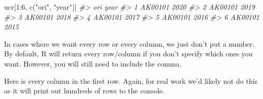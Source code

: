 \documentclass[
]{krantz}
\makeatletter
\newenvironment{Shaded}{\begin{snugshade}}{\end{snugshade}}
\newcommand{\CommentTok}[1]{\textcolor[rgb]{0.37,0.37,0.37}{\textit{#1}}}
\newcommand{\DecValTok}[1]{\textcolor[rgb]{0.06,0.06,0.06}{#1}}
\newcommand{\FunctionTok}[1]{\textcolor[rgb]{0,0,0}{#1}}
\newcommand{\NormalTok}[1]{#1}
\newcommand{\SpecialCharTok}[1]{\textcolor[rgb]{0,0,0}{#1}}
\newcommand{\StringTok}[1]{\textcolor[rgb]{0.5,0.5,0.5}{#1}}
\newenvironment{kframe}{%
\medskip{}
\setlength{\fboxsep}{.8em}
 \def\at@end@of@kframe{}%
 \ifinner\ifhmode%
  \def\at@end@of@kframe{\end{minipage}}%
  \begin{minipage}{\columnwidth}%
 \fi\fi%
 \def\FrameCommand##1{\hskip\@totalleftmargin \hskip-\fboxsep
 \colorbox{shadecolor}{##1}\hskip-\fboxsep
     \hskip-\linewidth \hskip-\@totalleftmargin \hskip\columnwidth}%
 \MakeFramed {\advance\hsize-\width
   \@totalleftmargin\z@ \linewidth\hsize
   \@setminipage}}%
 {\par\unskip\endMakeFramed%
 \at@end@of@kframe}
\renewenvironment{Shaded}{\begin{kframe}}{\end{kframe}}
\makeatother
\begin{document}
\begin{Shaded}
\begin{Highlighting}[]
\NormalTok{ucr[}\DecValTok{1}\SpecialCharTok{:}\DecValTok{6}\NormalTok{, }\FunctionTok{c}\NormalTok{(}\StringTok{"ori"}\NormalTok{, }\StringTok{"year"}\NormalTok{)]}
\CommentTok{\#\textgreater{}       ori year}
\CommentTok{\#\textgreater{} 1 AK00101 2020}
\CommentTok{\#\textgreater{} 2 AK00101 2019}
\CommentTok{\#\textgreater{} 3 AK00101 2018}
\CommentTok{\#\textgreater{} 4 AK00101 2017}
\CommentTok{\#\textgreater{} 5 AK00101 2016}
\CommentTok{\#\textgreater{} 6 AK00101 2015}
\end{Highlighting}
\end{Shaded}

In cases where we want every row or every column, we just don't put a number. By default, R will return every row/column if you don't specify which ones you want. However, you will still need to include the comma.

Here is every column in the first row. Again, for real work we'd likely not do this as it will print out hundreds of rows to the console.
\end{document}
